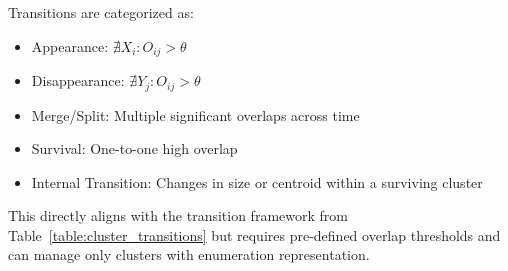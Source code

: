 Transitions are categorized as:
\begin{itemize}
    \item Appearance: $\nexists X_i: O_{ij} > \theta$

    \item Disappearance: $\nexists Y_j: O_{ij} > \theta$

    \item Merge/Split: Multiple significant overlaps across time

    \item Survival: One-to-one high overlap

    \item Internal Transition: Changes in size or centroid within a surviving cluster
\end{itemize}

This directly aligns with the transition framework from Table~\ref{table:cluster_transitions} 
but requires pre-defined overlap thresholds and can manage only
clusters with enumeration representation.


